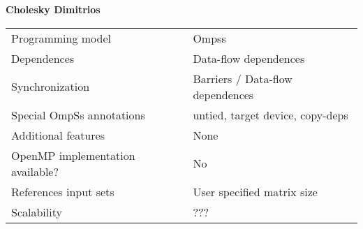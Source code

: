 \section*{}
\label{cholesky_dimitrios}
\centering
\Huge
\textbf{Cholesky Dimitrios}

\begin{table}[h!]
  \large
  \centering
  \begin{tabular}{|l|l|}
    \hline
    Programming model                & Ompss \\
    Dependences                      & Data-flow dependences \\
    Synchronization                  & Barriers / Data-flow dependences \\
    Special OmpSs annotations        & untied, target device, copy-deps\\
    Additional features              & None\\
    OpenMP implementation available? & No \\
    References input sets            & User specified matrix size \\
    Scalability                      & ??? \\
    \hline
  \end{tabular}
\end{table}

\newpage
